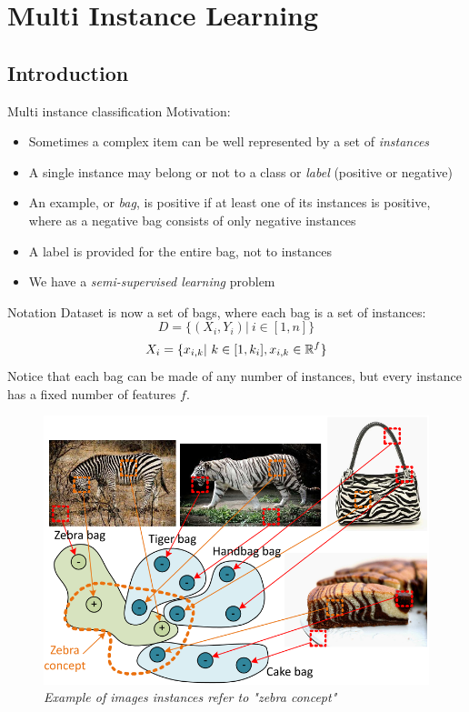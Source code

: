 \section{Multi Instance Learning}
 
\subsection*{Introduction}
\begin{frame}{Multi instance classification}
	Motivation:
	\begin{itemize}\setlength\itemsep{1em}
		\item Sometimes a complex item can be well represented by a set of \textit{instances}
		\item A single instance may belong or not to a class or \textit{label} (positive or negative)
		\item An example, or \textit{bag}, is positive if at least one of its instances is positive, where as a negative bag consists of only negative instances
		\item A label is provided for the
		entire bag, not to instances
		\item We have a \textit{semi-supervised learning} problem
	\end{itemize}
	\begin{flushright}
		\cite{mi1}
	\end{flushright}
\end{frame}

\begin{frame}{Notation}
	Dataset is now a set of bags, where each bag is a set of instances:
	$$D = \{(X_i, Y_i) | \ i \in [1, n]\}$$
	$$X_i = \{x_{i,k} | \ k \in [1, k_i], x_{i,k} \in \mathbb{R}^f\}$$
	Notice that each bag can be made of any number of instances, but every instance has a fixed number of features $f$.
	\begin{figure}[htbp]
		\centering
		\includegraphics[scale = 0.15]{./images/mi3.png}
		\caption{\textit{Example of images instances refer to "zebra concept"}}
	\end{figure}
\end{frame}

